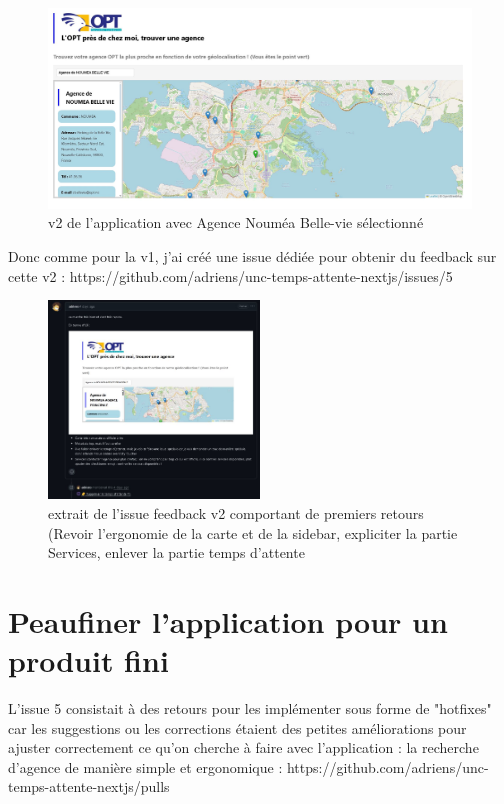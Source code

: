\documentclass[12pt,a4paper]{report}
\begin{document}
\begin{figure}[h] %
    \centering
    \includegraphics[width=1\textwidth]{ressources_rapport/app_opt_v2.JPG}
    \caption{v2 de l'application avec Agence Nouméa Belle-vie sélectionné}
\end{figure}
\vspace{8cm}
Donc comme pour la v1, j'ai créé une issue dédiée pour obtenir du feedback sur cette v2 : https://github.com/adriens/unc-temps-attente-nextjs/issues/5

\begin{figure}[h] %
    \centering
    \includegraphics[width=0.5\textwidth]{ressources_rapport/extrait_issue_5_2.JPG}
    \caption{extrait de l'issue feedback v2 comportant de premiers retours (Revoir l'ergonomie de la carte et de la sidebar, expliciter la partie Services, enlever la partie temps d'attente}
\end{figure}
\newpage

\section{Peaufiner l'application pour un produit fini}
L'issue 5 consistait à des retours pour les implémenter sous forme de "hotfixes" car les suggestions ou les corrections étaient des petites améliorations pour ajuster correctement ce qu'on cherche à faire avec l'application : la recherche d'agence de manière simple et ergonomique : https://github.com/adriens/unc-temps-attente-nextjs/pulls
\end{document}

